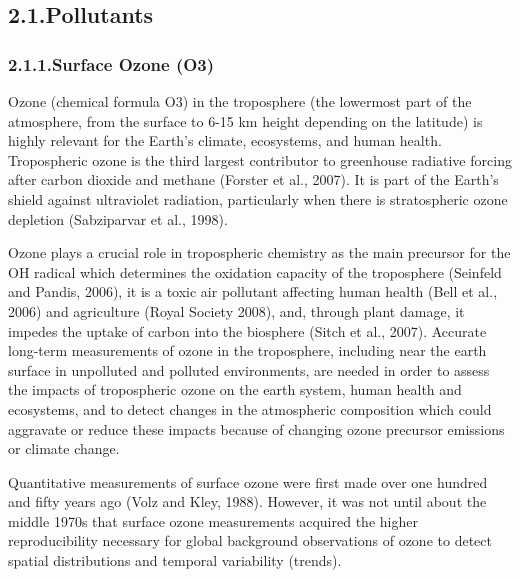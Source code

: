 \documentclass[9pt]{report}
\begin{document}
\subsection{2.1.\hspace*{0.5em}Pollutants}\label{sec-pollutants}%

\subsubsection{2.1.1.\hspace*{0.5em}Surface Ozone (O3)}\label{sec-surface-ozone-osub3sub}%

\noindent{}Ozone (chemical formula O3) in the troposphere (the lowermost part of the atmosphere, from the surface to 6-15 km height depending on the latitude) is highly relevant for the Earth’s climate, ecosystems, and human health.
Tropospheric ozone is the third largest contributor to greenhouse radiative forcing after carbon dioxide and methane (Forster et al., 2007).
It is part of the Earth’s shield against ultraviolet radiation, particularly when there is stratospheric ozone depletion (Sabziparvar et al., 1998).%

Ozone plays a crucial role in tropospheric chemistry as the main precursor for the OH radical which determines the oxidation capacity of the troposphere (Seinfeld and Pandis, 2006), it is a toxic air pollutant affecting human health (Bell et al., 2006) and agriculture (Royal Society 2008), and, through plant damage, it impedes the uptake of carbon into the biosphere (Sitch et al., 2007). 
Accurate long-term measurements of ozone in the troposphere, including near the earth surface in unpolluted and polluted environments, are needed in order to assess the impacts of tropospheric ozone on the earth system, human health and ecosystems, and to detect changes in the atmospheric composition which could aggravate or reduce these impacts because of changing ozone precursor emissions or climate change.%

Quantitative measurements of surface ozone were first made over one hundred and fifty years ago (Volz and Kley, 1988).
However, it was not until about the middle 1970s that surface ozone measurements acquired the higher reproducibility necessary for global background observations of ozone to detect spatial distributions and temporal variability (trends).%
\end{document}
